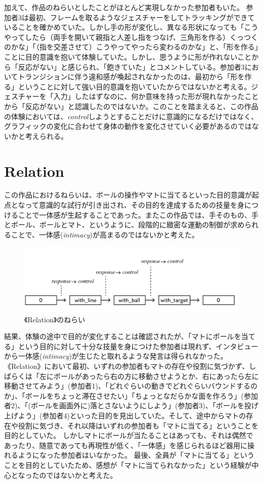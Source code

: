 加えて、作品のねらいとしたことがほとんど実現しなかった参加者もいた。
参加者3は最初、フレームを取るようなジェスチャーをしてトラッキングができていることを確かめていた。しかし手の形が変化し、異なる形状になっても「こうやってしたら（両手を開いて親指と人差し指をつなげ、三角形を作る）くっつくのかな」「（指を交差させて）こうやってやったら変わるのかな」と、「形を作る」ことに目的意識を抱いて体験していた。しかし、思うように形が作れないことから「反応がない」と感じられ、「飽きていた」とコメントしている。参加者3においてトランジションに伴う違和感が喚起されなかったのは、最初から「形を作る」ということに対して強い目的意識を抱いていたからではないかと考える。ジェスチャーを「入力」したはずなのに、何か意味を持った形が現れなかったことから「反応がない」と認識したのではないか。このことを踏まえると、この作品の体験においては、\textit{control}しようとすることだけに意識的になるだけではなく、グラフィックの変化に合わせて身体の動作を変化させていく必要があるのではないかと考えられる。

\section{Relation}
この作品におけるねらいは、ボールの操作やマトに当てるといった目的意識が起点となって意識的な試行が引き出され、その目的を達成するための技量を身につけることで一体感が生起することであった。またこの作品では、手そのもの、手とボール、ボールとマト、というように、段階的に緻密な運動の制御が求められることで、一体感(\textit{intimacy})が高まるのではないかと考えた。

\begin{figure}[H]
  \centering
  \includegraphics[width=15cm]{img/nerai_rl.png}
  \caption{《Relation》のねらい}
  \label{fig:nerai_rl_in_discussion}
\end{figure}

結果、体験の途中で目的が変化することは確認されたが、「マトにボールを当てる」という目的に対して十分な技量を身につけた参加者は現れず、インタビューから一体感(\textit{intimacy})が生じたと取れるような発言は得られなかった。
《Relation》において最初、いずれの参加者もマトの存在や役割に気づかず、しばらくは「左にボールがあったら右の方に移動させようとか、右にあったら左に移動させてみよう」(参加者1)、「どれぐらいの動きでどれぐらいバウンドするのか」、「ボールをちょっと滞在させたい」「ちょっとなだらかな面を作ろう」(参加者2)、「(ボールを画面外に)落とさないようにしよう」(参加者3)、「ボールを投げ上げよう」(参加者4)といった目的を見出していた。そして、途中からマトの存在や役割に気づき、それ以降はいずれの参加者も「マトに当てる」ということを目的としていた。
しかしマトにボールが当たることはあっても、それは偶然であったり、随意であっても再現性が低く、「一体感」を感じられるほど器用に操れるようになった参加者はいなかった。
最後、全員が「マトに当てる」ということを目的としていたため、感想が「マトに当てられなかった」という経験が中心となったのではないかと考えた。

